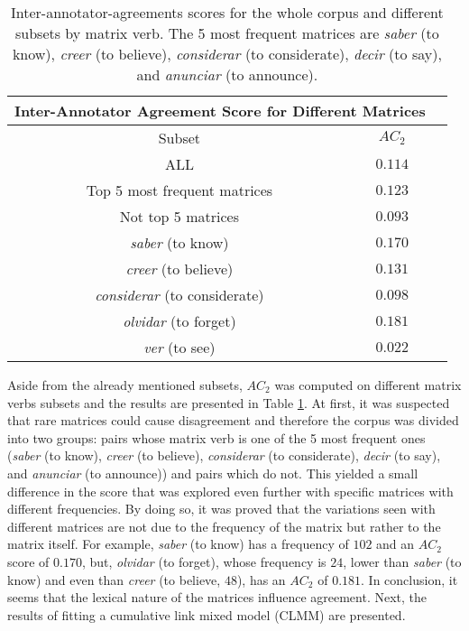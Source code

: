 \begin{table}
\center
\begin{tabular}{|c|c|c|}
\hline
\multicolumn{2}{|c|}{Inter-Annotator Agreement Score for Different Matrices}\\\hline
                     Subset & $AC_2$\\\hline 
ALL & $0.114$\\\hline 
Top 5 most frequent matrices & $0.123$\\\hline
Not top 5 matrices & $0.093$\\\hline
\textit{saber} (to know) & $0.170$\\\hline
\textit{creer} (to believe) & $0.131$\\\hline
\textit{considerar} (to considerate) & $0.098$\\\hline
\textit{olvidar} (to forget) & $0.181$\\\hline
\textit{ver} (to see) & $0.022$\\\hline
\end{tabular}
\caption[AC2 matrices.]{Inter-annotator-agreements scores for the whole corpus and different subsets by matrix verb. The 5 most frequent matrices are \textit{saber} (to know), \textit{creer} (to believe), \textit{considerar} (to considerate), \textit{decir} (to say), and \textit{anunciar} (to announce).}
\label{tab:iaamatrix}
\end{table}

Aside from the already mentioned subsets, $AC_2$ was computed on different matrix verbs subsets and the results are presented in Table \ref{tab:iaamatrix}. At first, it was suspected that rare matrices could cause disagreement and therefore the corpus was divided into two groups: pairs whose matrix verb is one of the 5 most frequent ones (\textit{saber} (to know), \textit{creer} (to believe), \textit{considerar} (to considerate), \textit{decir} (to say), and \textit{anunciar} (to announce)) and pairs which do not. This yielded a small difference in the score that was explored even further with specific matrices with different frequencies. By doing so, it was proved that the variations seen with different matrices are not due to the frequency of the matrix but rather to the matrix itself. For example, \textit{saber} (to know) has a frequency of $102$ and an $AC_2$ score of $0.170$, but, \textit{olvidar} (to forget), whose frequency is $24$, lower than \textit{saber} (to know) and even than \textit{creer} (to believe, $48$), has an $AC_2$ of $0.181$. In conclusion, it seems that the lexical nature of the matrices influence agreement. Next, the results of fitting a cumulative link mixed model (CLMM) are presented.\\

